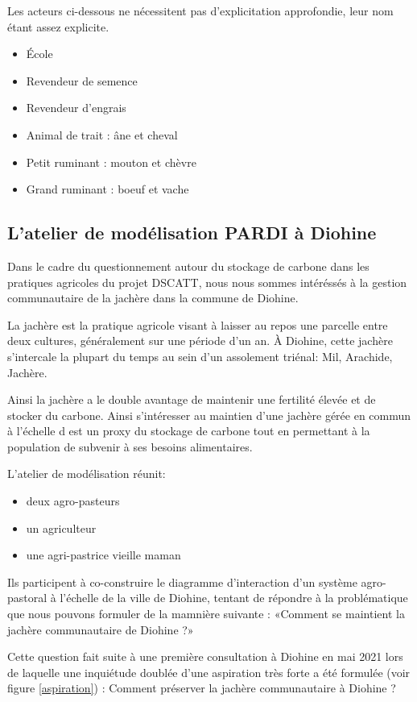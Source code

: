 Les acteurs ci-dessous ne nécessitent pas d'explicitation approfondie, leur nom étant assez explicite.

\begin{itemize}
\item École
\item Revendeur de semence
\item Revendeur d'engrais
\item Animal de trait : âne et cheval
\item Petit ruminant : mouton et chèvre
\item Grand ruminant : boeuf et vache
\end{itemize}

\subsection{L'atelier de modélisation PARDI à Diohine }

Dans le cadre du questionnement autour du stockage de carbone dans les pratiques agricoles du projet DSCATT, nous nous sommes intéréssés à la gestion communautaire de la jachère dans la commune de Diohine.

La jachère est la pratique agricole visant à laisser au repos une parcelle entre deux cultures, généralement sur une période d'un an. À Diohine, cette jachère s'intercale la plupart du temps au sein d'un assolement triénal: Mil, Arachide, Jachère.

Ainsi la jachère a le double avantage de maintenir une fertilité élevée et de stocker du carbone. Ainsi s'intéresser au maintien d'une jachère gérée en commun à l'échelle d est un proxy du stockage de carbone tout en permettant à la population de subvenir à ses besoins alimentaires.

L'atelier de modélisation réunit:
\begin{itemize}
  \item deux agro-pasteurs
  \item un agriculteur
  \item une agri-pastrice vieille maman
\end{itemize}

Ils participent à co-construire le diagramme d'interaction d'un système agro-pastoral à l'échelle de la ville de Diohine, tentant de répondre à la problématique que nous pouvons formuler de la mamnière suivante : «Comment se maintient la jachère communautaire de Diohine ?»

Cette question fait suite à une première consultation à Diohine en mai 2021 lors de laquelle une inquiétude doublée d'une aspiration très forte a été formulée (voir figure \ref{aspiration}) : Comment préserver la jachère communautaire à Diohine ?\cite{perrotton_definition_2021}



